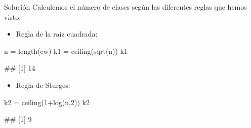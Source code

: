 \documentclass[
  ignorenonframetext,
  aspectratio=169]{beamer}
\newenvironment{Shaded}{\begin{snugshade}}{\end{snugshade}}
\newcommand{\DecValTok}[1]{\textcolor[rgb]{0.00,0.00,0.81}{#1}}
\newcommand{\FunctionTok}[1]{\textcolor[rgb]{0.00,0.00,0.00}{#1}}
\newcommand{\NormalTok}[1]{#1}
\newcommand{\OtherTok}[1]{\textcolor[rgb]{0.56,0.35,0.01}{#1}}
\newcommand{\SpecialCharTok}[1]{\textcolor[rgb]{0.00,0.00,0.00}{#1}}
\providecommand{\tightlist}{%
  \setlength{\itemsep}{0pt}\setlength{\parskip}{0pt}}
\let\oldverbatim\verbatim
\let\endoldverbatim\endverbatim
\renewenvironment{verbatim}{\tiny\oldverbatim}{\endoldverbatim}
\begin{document}
\begin{frame}[fragile]{Solución}
\protect\hypertarget{soluciuxf3n-1}{}
Calculemos el número de clases según las diferentes reglas que hemos
visto:

\begin{itemize}
\tightlist
\item
  Regla de la raíz cuadrada:
\end{itemize}

\begin{Shaded}
\begin{Highlighting}[]
\NormalTok{n }\OtherTok{=} \FunctionTok{length}\NormalTok{(cw)}
\NormalTok{k1 }\OtherTok{=} \FunctionTok{ceiling}\NormalTok{(}\FunctionTok{sqrt}\NormalTok{(n))}
\NormalTok{k1}
\end{Highlighting}
\end{Shaded}

\begin{verbatim}
## [1] 14
\end{verbatim}

\begin{itemize}
\tightlist
\item
  Regla de Sturges:
\end{itemize}

\begin{Shaded}
\begin{Highlighting}[]
\NormalTok{k2 }\OtherTok{=} \FunctionTok{ceiling}\NormalTok{(}\DecValTok{1}\SpecialCharTok{+}\FunctionTok{log}\NormalTok{(n,}\DecValTok{2}\NormalTok{))}
\NormalTok{k2}
\end{Highlighting}
\end{Shaded}

\begin{verbatim}
## [1] 9
\end{verbatim}
\end{frame}
\end{document}
